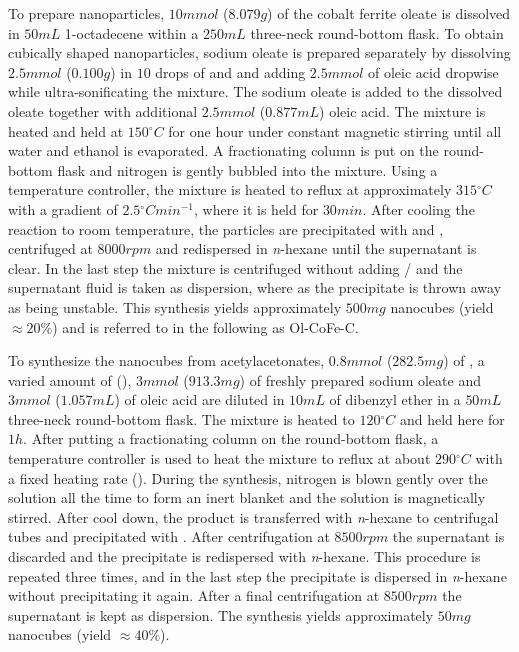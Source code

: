 \documentclass[\main/dresen_thesis.tex]{subfiles}
\begin{document}
    To prepare nanoparticles, $10 \unit{mmol}$ ($8.079 \unit{g}$) of the cobalt ferrite oleate is dissolved in $50 \unit{mL}$ 1-octadecene within a $250 \unit{mL}$ three-neck round-bottom flask.
    To obtain cubically shaped nanoparticles, sodium oleate is prepared separately by dissolving $2.5 \unit{mmol}$ ($0.100 \unit{g}$)  in $10$ drops of  and  and adding $2.5 \unit{mmol}$ of oleic acid dropwise while ultra-sonificating the mixture.
    The sodium oleate is added to the dissolved oleate together with additional $2.5 \unit{mmol}$ ($0.877 \unit{mL}$) oleic acid.
    The mixture is heated and held at $150 \unit{^\circ C}$ for one hour under constant magnetic stirring until all water and ethanol is evaporated.
    A fractionating column is put on the round-bottom flask and nitrogen is gently bubbled into the mixture.
    Using a temperature controller, the mixture is heated to reflux at approximately $315 \unit{^\circ C}$ with a gradient of $2.5 \unit{^\circ C min^{-1}}$, where it is held for $30 \unit{min}$.
    After cooling the reaction to room temperature, the particles are precipitated with  and , centrifuged at $8000 \unit{rpm}$ and redispersed in \textit{n}-hexane until the supernatant is clear.
    In the last step the mixture is centrifuged without adding / and the supernatant fluid is taken as dispersion, where as the precipitate is thrown away as being unstable.
    This synthesis yields approximately $500 \unit{mg}$ nanocubes (yield $\approx 20 \%$) and is referred to in the following as Ol-CoFe-C.


    To synthesize the nanocubes from acetylacetonates, $0.8 \unit{mmol}$ ($282.5 \unit{mg}$) of , a varied amount of  (), $3 \unit{mmol}$ ($913.3 \unit{mg}$) of freshly prepared sodium oleate and $3 \unit{mmol}$ ($1.057 \unit{mL}$) of oleic acid are diluted in $10 \unit{mL}$ of dibenzyl ether in a $50 \unit{mL}$ three-neck round-bottom flask.
    The mixture is heated to $120 \unit{^\circ C}$ and held here for $1 \unit{h}$.
    After putting a fractionating column on the round-bottom flask, a temperature controller is used to heat the mixture to reflux at about $290 \unit{^\circ C}$ with a fixed heating rate ().
    During the synthesis, nitrogen is blown gently over the solution all the time to form an inert blanket and the solution is magnetically stirred.
    After cool down, the product is transferred with \textit{n}-hexane to centrifugal tubes and precipitated with .
    After centrifugation at $8500 \unit{rpm}$ the supernatant is discarded and the precipitate is redispersed with \textit{n}-hexane.
    This procedure is repeated three times, and in the last step the precipitate is dispersed in \textit{n}-hexane without precipitating it again.
    After a final centrifugation at $8500 \unit{rpm}$ the supernatant is kept as dispersion.
    The synthesis yields approximately $50 \unit{mg}$ nanocubes (yield $\approx 40 \%$).
\end{document}
